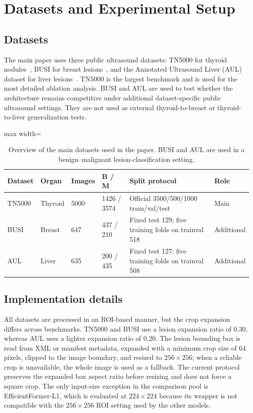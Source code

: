 \section{Datasets and Experimental Setup}
\label{sec:experimental_setup}

\subsection{Datasets}
The main paper uses three public ultrasound datasets: TN5000 for thyroid nodules~\cite{Zhang_2025}, BUSI for breast lesions~\cite{Al_Dhabyani_2020}, and the Annotated Ultrasound Liver (AUL) dataset for liver lesions~\cite{aul_dataset}. TN5000 is the largest benchmark and is used for the most detailed ablation analysis. BUSI and AUL are used to test whether the architecture remains competitive under additional dataset-specific public ultrasound settings. They are not used as external thyroid-to-breast or thyroid-to-liver generalization tests.

\begin{table}[t]
    \centering
    \small
    \caption{Overview of the main datasets used in the paper. BUSI and AUL are used in a benign--malignant lesion-classification setting.}
    \label{tab:datasets}
    \begin{adjustbox}{max width=\columnwidth}
    \begin{tabular}{llllll}
        \toprule
        Dataset & Organ & Images & B / M & Split protocol & Role \\
        \midrule
        TN5000 & Thyroid & 5000 & 1426 / 3574 & Official 3500/500/1000 train/val/test & Main \\
        BUSI & Breast & 647 & 437 / 210 & Fixed test 129; five training folds on trainval 518 & Additional \\
        AUL & Liver & 635 & 200 / 435 & Fixed test 127; five training folds on trainval 508 & Additional \\
        \bottomrule
    \end{tabular}
    \end{adjustbox}
\end{table}

\subsection{Implementation details}
All datasets are processed in an ROI-based manner, but the crop expansion differs across benchmarks. TN5000 and BUSI use a lesion expansion ratio of 0.30, whereas AUL uses a lighter expansion ratio of 0.20. The lesion bounding box is read from XML or manifest metadata, expanded with a minimum crop size of 64 pixels, clipped to the image boundary, and resized to $256 \times 256$; when a reliable crop is unavailable, the whole image is used as a fallback. The current protocol preserves the expanded box aspect ratio before resizing and does not force a square crop. The only input-size exception in the comparison pool is EfficientFormer-L1, which is evaluated at $224 \times 224$ because its wrapper is not compatible with the $256 \times 256$ ROI setting used by the other models.

